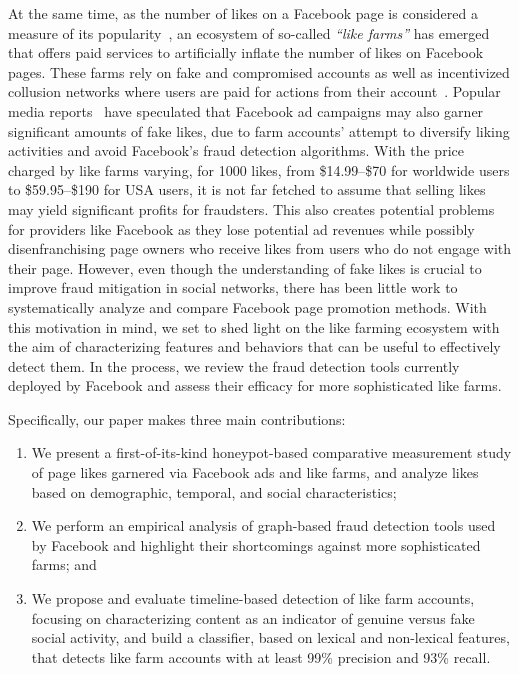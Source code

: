 \documentclass[twocolumn,10pt,letterpaper]{article}
\begin{document}
At the same time, as the number of likes on a Facebook page is considered a measure of its popularity~\cite{carter13like}, an ecosystem of so-called {\em ``like farms''} has emerged that offers paid services to artificially inflate the number of likes on Facebook pages. These farms rely on fake and compromised accounts as well as incentivized collusion networks where users are paid for actions from their account~\cite{viswanath14tanomaloussocialnetwork}.
Popular media reports~\cite{bbc,dangerousminds,guardianreport,veritasiumfbfraud,likeorlie} have speculated that Facebook ad campaigns may also garner significant amounts of fake likes, due to farm accounts' attempt to diversify liking activities and avoid Facebook's fraud detection algorithms.
With the price charged by like farms varying, for 1000 likes, from \$14.99--\$70 for worldwide users to \$59.95--\$190 for USA users, it is not far fetched to assume that selling likes may yield significant profits for fraudsters.
This also creates potential problems for providers like Facebook as they lose potential ad revenues while possibly disenfranchising page owners who receive likes from users who do not engage with their page.
However, even though the understanding of fake likes is crucial to improve fraud mitigation in social networks, there has been little work to systematically analyze and compare Facebook page promotion methods.
%
With this motivation in mind, we set to shed light on the like farming ecosystem with the aim of characterizing features and behaviors that can be useful to effectively detect them. In the process, we review the fraud detection tools currently deployed by Facebook and assess their efficacy for more sophisticated like farms.

Specifically, our paper makes three main contributions:
\begin{enumerate}
\item We present a first-of-its-kind honeypot-based comparative measurement study of page likes garnered via Facebook ads and like farms, and  analyze likes based on demographic, temporal, and social characteristics;
\item We perform an empirical analysis of graph-based fraud detection tools used by Facebook and highlight their shortcomings against more sophisticated farms; and
\item We propose and evaluate timeline-based detection of like farm accounts, focusing on characterizing content as an indicator of genuine versus fake social activity, and build a classifier, based on lexical and non-lexical features, that detects like farm accounts with at least 99\% precision and 93\% recall.
\end{enumerate}
\end{document}
